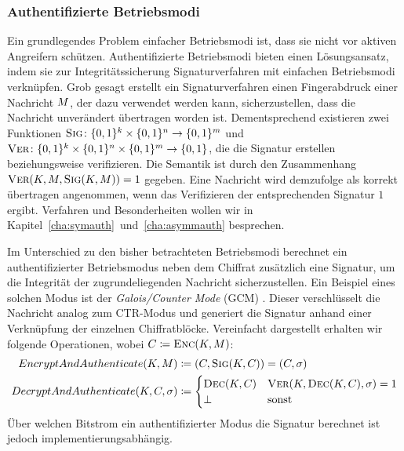 \subsubsection{Authentifizierte Betriebsmodi}\label{sssec:gcm} 
Ein grundlegendes Problem einfacher Betriebsmodi ist, dass sie nicht vor
aktiven Angreifern schützen. Authentifizierte
Betriebsmodi bieten
einen Lösungsansatz, indem sie zur Integritätssicherung
Signaturverfahren \indexSig mit einfachen Betriebsmodi verknüpfen. 
 Grob gesagt erstellt ein Signaturverfahren einen Fingerabdruck einer
Nachricht $M$, der dazu verwendet werden kann, sicherzustellen,
dass die Nachricht unverändert übertragen worden ist. Dementsprechend
existieren zwei Funktionen $\textsc{Sig} \colon \{0,1\}^k \times \{0,1\}^n
\rightarrow \{0,1\}^m$ und $\textsc{Ver} \colon \{0,1\}^k \times \{0,1\}^n
\times \{0,1\}^m \rightarrow \{0,1\}$, die die Signatur erstellen
beziehungsweise verifizieren. Die Semantik ist durch den Zusammenhang
$\textsc{Ver}(K,M,\textsc{Sig}(K, M)) = 1$ gegeben. Eine Nachricht
wird demzufolge als korrekt übertragen angenommen, wenn das Verifizieren
der entsprechenden Signatur $1$ ergibt.
Verfahren und Besonderheiten wollen wir in
Kapitel~\ref{cha:symauth}~und~\ref{cha:asymmauth} besprechen. 

Im Unterschied zu den bisher betrachteten Betriebsmodi berechnet ein
authentifizierter Betriebsmodus neben dem Chiffrat zusätzlich eine
Signatur, um die Integrität der zugrundeliegenden Nachricht
sicherzustellen. Ein Beispiel eines solchen Modus ist der
\emph{Galois/Counter Mode} (GCM) \cite{NIST_GCM05}. Dieser verschlüsselt
die Nachricht analog zum CTR-Modus und generiert die Signatur anhand
einer Verknüpfung der einzelnen Chiffratblöcke. Vereinfacht dargestellt
erhalten wir folgende Operationen, wobei $C \coloneqq \textsc{Enc}(K,
M)$:
\begin{align*}
  EncryptAndAuthenticate(K, M) &\coloneqq (C, \textsc{Sig}(K, C)) = (C, \sigma)\\
  DecryptAndAuthenticate(K, C, \sigma) &\coloneqq \begin{cases}
    \textsc{Dec}(K, C) & \textsc{Ver}(K, \textsc{Dec}(K, C), \sigma) = 1 \\
    \bot & \textnormal{sonst}
  \end{cases}
\end{align*}
Über welchen Bitstrom ein authentifizierter Modus die Signatur berechnet
ist jedoch implementierungsabhängig. 

